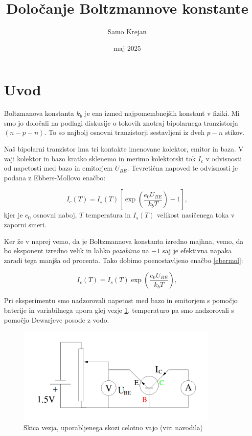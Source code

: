 \documentclass[12pt]{article}
\title{\textbf{Določanje Boltzmannove konstante}}
\author{Samo Krejan}
\date{maj 2025}
\begin{document}
\maketitle

\section{Uvod}

Boltzmanova konstanta $k_b$ je ena izmed najpomembnejših konstant v fiziki. Mi smo jo določali na podlagi diskusije o tokovih znotraj bipolarnega tranzistorja $(n-p-n)$. To so najbolj osnovni tranzistorji sestavljeni iz dveh $p-n$ stikov.

Naš bipolarni tranzistor ima tri kontakte imenovane kolektor, emitor in baza. V vaji kolektor in bazo kratko sklenemo in merimo kolektorski tok $I_c$ v odvisnosti od napetosti med bazo in emitorjem $U_{BE}$. Tevretična napoved te odvisnosti je podana z Ebbers-Mollovo enačbo:

\begin{equation*}
    I_c(T) = I_s(T)\left[\exp(\frac{e_0U_{BE}}{k_bT}) - 1\right],
\end{equation*}
kjer je $e_0$ osnovni naboj, $T$ temperatura in $I_s(T)$ velikost nasičenega toka v zaporni smeri.

Ker že v naprej vemo, da je Boltzmannova konstanta izredno majhna, vemo, da bo eksponent izredno velik in lahko \textit{pozabimo} na $-1$ saj je efektivna napaka zaradi tega manjša od procenta. Tako dobimo poenostavljeno enačbo \ref{ebermol}:

\begin{equation}
    I_c(T) = I_s(T)\exp(\frac{e_0U_{BE}}{k_bT}),
    \label{ebermol}
\end{equation}

Pri eksperimentu smo nadzorovali napetost med bazo in emitorjem s pomočjo baterije in variabilnega upora glej vezje \ref{vezje}, temperaturo pa smo nadzorovali s pomočjo Dewarjeve posode z vodo.

\begin{figure}[ht]
\begin{center}
    \includegraphics[width=10cm]{vezje.png}
    \caption{Skica vezja, uporabljenega skozi celotno vajo (vir: navodila)}
    \label{vezje}
\end{center}
\end{figure}
\end{document}
